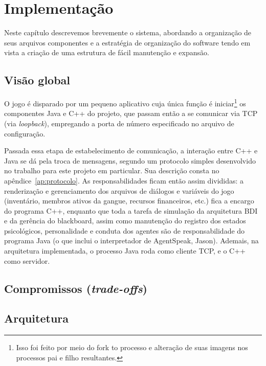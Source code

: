 \chapter{Implementação}

Neste capítulo descrevemos brevemente o sistema, abordando a organização de seus arquivos componentes e a estratégia de organização do software tendo em vista a criação de uma estrutura de fácil manutenção e expansão.

\section{Visão global}

O jogo é disparado por um pequeno aplicativo cuja única função é iniciar\footnote{Isso foi feito por meio do fork to processo e alteração de suas imagens nos processos pai e filho resultantes.} os componentes Java e C++ do projeto, que passam então a se comunicar via TCP (via \emph{loopback}), empregando a porta de número especificado no arquivo de configuração.

Passada essa etapa de estabelecimento de comunicação, a interação entre C++ e Java se dá pela troca de mensagens, segundo um protocolo simples desenvolvido no trabalho para este projeto em particular. Sua descrição consta no apêndice~\ref{ap:protocolo}. As responsabilidades ficam então assim divididas: a renderização e gerenciamento dos arquivos de diálogos e variáveis do jogo (inventário, membros ativos da gangue, recursos financeiros, etc.) fica a encargo do programa C++, enquanto que toda a tarefa de simulação da arquitetura  BDI e da gerência do blackboard, assim como manutenção do registro dos estados psicológicos, personalidade e conduta dos agentes são de responsabilidade do programa Java (o que inclui o interpretador de AgentSpeak, Jason). Ademais, na arquitetura implementada, o processo Java roda como cliente TCP, e o C++ como servidor.



\section{Compromissos (\emph{trade-offs})}\label{sec:tradeoffs}

\section{Arquitetura}


